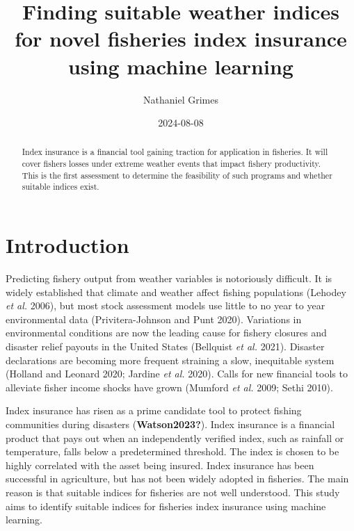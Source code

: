 \documentclass[
  letterpaper,
  DIV=11,
  numbers=noendperiod]{scrartcl}
\title{Finding suitable weather indices for novel fisheries index
insurance using machine learning}
\author{Nathaniel Grimes}
\date{2024-08-08}
\renewcommand*\contentsname{Table of contents}
\newcommand\contentsname{Table of contents}
\begin{document}
\maketitle
\begin{abstract}
Index insurance is a financial tool gaining traction for application in
fisheries. It will cover fishers losses under extreme weather events
that impact fishery productivity. This is the first assessment to
determine the feasibility of such programs and whether suitable indices
exist.
\end{abstract}
\ifdefined\Shaded\renewenvironment{Shaded}{\begin{tcolorbox}[sharp corners, frame hidden, interior hidden, boxrule=0pt, breakable, enhanced, borderline west={3pt}{0pt}{shadecolor}]}{\end{tcolorbox}}\fi

\renewcommand*\contentsname{Table of contents}
{
\hypersetup{linkcolor=}
\setcounter{tocdepth}{3}
\tableofcontents
}
\hypertarget{introduction}{%
\section{Introduction}\label{introduction}}

Predicting fishery output from weather variables is notoriously
difficult. It is widely established that climate and weather affect
fishing populations (Lehodey \emph{et al.} 2006), but most stock
assessment models use little to no year to year environmental data
(Privitera-Johnson and Punt 2020). Variations in environmental
conditions are now the leading cause for fishery closures and disaster
relief payouts in the United States (Bellquist \emph{et al.} 2021).
Disaster declarations are becoming more frequent straining a slow,
inequitable system (Holland and Leonard 2020; Jardine \emph{et al.}
2020). Calls for new financial tools to alleviate fisher income shocks
have grown (Mumford \emph{et al.} 2009; Sethi 2010).

Index insurance has risen as a prime candidate tool to protect fishing
communities during disasters (\textbf{Watson2023?}). Index insurance is
a financial product that pays out when an independently verified index,
such as rainfall or temperature, falls below a predetermined threshold.
The index is chosen to be highly correlated with the asset being
insured. Index insurance has been successful in agriculture, but has not
been widely adopted in fisheries. The main reason is that suitable
indices for fisheries are not well understood. This study aims to
identify suitable indices for fisheries index insurance using machine
learning.
\end{document}
